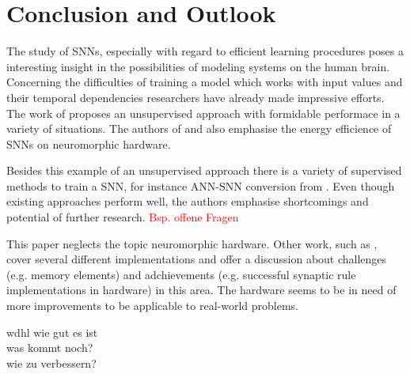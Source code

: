 \section{Conclusion and Outlook}
\label{sec:conclusion}

The study of \acp{SNN}, especially with regard to efficient learning procedures poses a interesting insight in the possibilities of modeling
systems on the human brain.
Concerning the difficulties of training a model which works with input values and their temporal dependencies researchers have already made 
impressive efforts.
The work of \cite{SNN} proposes an unsupervised approach with formidable performace in a variety of situations.
The authors of \cite{SNN} and \cite{Synaptic_plasticity} also emphasise the energy efficience of \acp{SNN} on neuromorphic hardware.

Besides this example of an unsupervised approach there is a variety of supervised methods to train a \ac{SNN}, 
for instance \ac{ANN}-\ac{SNN} conversion from \cite{DIET_SNN}.
Even though existing approaches perform well, the authors emphasise shortcomings and potential of further research.
\textcolor{red}{Bsp. offene Fragen}

This paper neglects the topic neuromorphic hardware.
Other work, such as \cite{Synaptic_plasticity}, 
cover several different implementations and offer a discussion about challenges (e.g. memory elements) and adchievements 
(e.g. successful synaptic rule implementations in hardware) in this area.
The hardware seems to be in need of more improvements to be applicable to real-world problems.

wdhl wie gut es ist\\
was kommt noch?\\
wie zu verbessern?